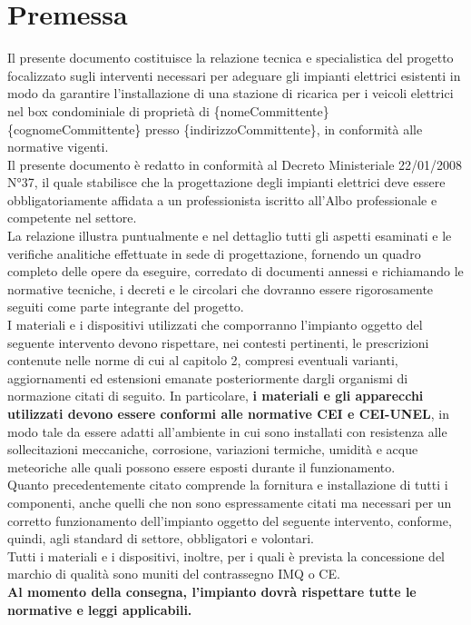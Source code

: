 \newpage
\pagestyle{fancy}

\section{Premessa}

Il presente documento costituisce la relazione tecnica e specialistica del progetto focalizzato sugli interventi necessari per adeguare gli impianti elettrici esistenti in modo da garantire l’installazione di una stazione di ricarica per i veicoli elettrici nel box condominiale di proprietà di \{nomeCommittente\} \{cognomeCommittente\} presso \{indirizzoCommittente\}, in conformità alle normative vigenti. \\
Il presente documento è redatto in conformità al Decreto Ministeriale 22/01/2008 N°37, il quale stabilisce che la progettazione degli impianti elettrici deve essere obbligatoriamente affidata a un professionista iscritto all'Albo professionale e competente nel settore. \\
La relazione illustra puntualmente e nel dettaglio tutti gli aspetti esaminati e le verifiche analitiche effettuate in sede di progettazione, fornendo un quadro completo delle opere da eseguire, corredato di documenti annessi e richiamando le normative tecniche, i decreti e le circolari che dovranno essere rigorosamente seguiti come parte integrante del progetto. \\
I materiali e i dispositivi utilizzati che comporranno l’impianto oggetto del seguente intervento devono rispettare, nei contesti pertinenti, le prescrizioni contenute nelle norme di cui al capitolo 2, compresi eventuali varianti, aggiornamenti ed estensioni emanate posteriormente dargli organismi di normazione citati di seguito. In particolare, \textbf{i materiali e gli apparecchi utilizzati devono essere conformi alle normative CEI e CEI-UNEL}, in modo tale da essere adatti all’ambiente in cui sono installati con resistenza alle sollecitazioni meccaniche, corrosione, variazioni termiche, umidità e acque meteoriche alle quali possono essere esposti durante il funzionamento. \\
Quanto precedentemente citato comprende la fornitura e installazione di tutti i componenti, anche quelli che non sono espressamente citati ma necessari per un corretto funzionamento dell’impianto oggetto del seguente intervento, conforme, quindi, agli standard di settore, obbligatori e volontari. \\
Tutti i materiali e i dispositivi, inoltre, per i quali è prevista la concessione del marchio di qualità sono muniti del contrassegno IMQ o CE. \\
\textbf{Al momento della consegna, l’impianto dovrà rispettare tutte le normative e leggi applicabili.}



